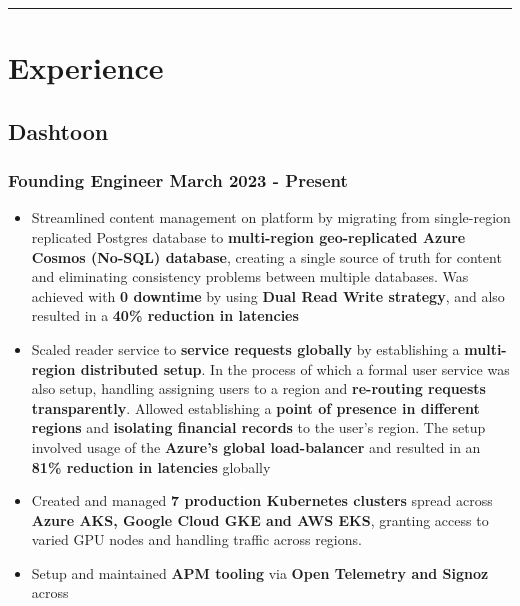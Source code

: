 \documentclass[12pt]{article}
\newcommand{\spacedhrule}[1]{
    \vspace{1ex}
    \hrule
    \vspace{#1}
}
\newcommand{\experienceItem}{\item [-] \small}
\newcommand{\spacedSubSubSection}[2]{\subsubsection {{#1} \hspace*{\fill} {#2}}}
\begin{document}
    \vspace{-0.5ex}
    \spacedhrule{2ex}

    \section{Experience}
    {
        \subsection{Dashtoon}
        {
        \spacedSubSubSection{Founding Engineer}{March 2023 - Present}
            {
                \begin{itemize}[itemsep=0.1ex, leftmargin=6ex, rightmargin=1ex]
                    \experienceItem
                    {
                        Streamlined content management on platform by migrating from single-region replicated Postgres
                        database to \textbf {multi-region geo-replicated Azure Cosmos (No-SQL) database}, \mbox {creating} a
                        single source of truth for content and eliminating consistency problems between \mbox {multiple} databases.
                        Was achieved with \textbf {0 downtime} by using \textbf {Dual Read Write strategy}, and also
                        \mbox {resulted} in a \textbf {40\% reduction in latencies}
                    }
                    \experienceItem
                    {
                        Scaled reader service to \textbf {service requests globally} by establishing a
                        \textbf {multi-region distributed setup}. In the process of which a formal user service was
                        also setup, handling assigning users to a region and \textbf {re-routing requests transparently}.
                        Allowed establishing a \textbf {point of \mbox {presence} in different regions} and
                        \textbf {isolating financial records} to the user's region. The setup involved \mbox {usage} of the
                        \textbf {Azure's global load-balancer} and resulted in an \textbf {81\% reduction in latencies}
                        \mbox{globally}
                    }
                    \experienceItem
                    {
                        Created and managed \textbf {7 production Kubernetes clusters} spread across
                        \textbf {Azure AKS, Google Cloud GKE and AWS EKS}, granting access to varied GPU nodes and
                        handling traffic across regions.
                    }
                    \experienceItem
                    {
                        Setup and maintained \textbf {APM tooling} via \textbf {Open Telemetry and Signoz} across
}
\end{itemize}}}}
\end{document}

